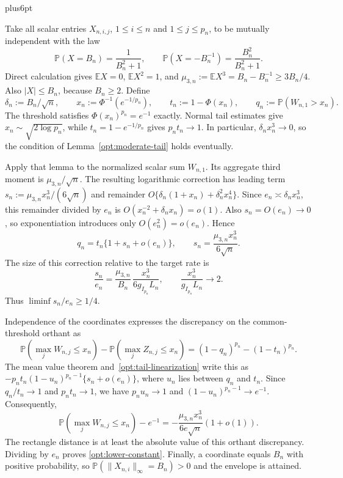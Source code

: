 \documentclass[11pt,letterpaper,twoside,leqno]{article}
\makeatletter
\theoremstyle{bookplain}
\theoremstyle{bookremark}
\renewenvironment{proof}[1][\proofname]{\par
  \pushQED{\qed}\normalfont\topsep6pt plus6pt\relax
  \trivlist\item[\hskip\labelsep\bfseries #1\@addpunct{.}]\ignorespaces
}{\popQED\endtrivlist\@endpefalse}
\newcommand{\E}{\mathbb E}
\newcommand{\Pp}{\mathbb P}
\makeatother
\begin{document}
\begin{proof}[Proof of Theorem~\ref{opt:skew-lower}]
Take all scalar entries $X_{n,i,j}$, $1\le i\le n$ and
$1\le j\le p_n$, to be mutually independent with the law
\begin{equation}
 \Pp(X=B_n)=\frac1{B_n^2+1},\qquad
 \Pp(X=-B_n^{-1})=\frac{B_n^2}{B_n^2+1}.
 \label{opt:two-point-law}
\end{equation}
Direct calculation gives $\E X=0$, $\E X^2=1$, and
$\mu_{3,n}:=\E X^3=B_n-B_n^{-1}\ge3B_n/4$.
Also $|X|\le B_n$, because $B_n\ge2$. Define
\[
 \delta_n:=B_n/\sqrt n,\qquad
 x_n:=\Phi^{-1}(e^{-1/p_n}),\qquad
 t_n:=1-\Phi(x_n),\qquad q_n:=\Pp(W_{n,1}>x_n).
\]
The threshold satisfies $\Phi(x_n)^{p_n}=e^{-1}$ exactly.
Normal tail estimates give $x_n\sim\sqrt{2\log p_n}$,
while $t_n=1-e^{-1/p_n}$ gives $p_nt_n\to1$.
In particular, $\delta_nx_n^3\to0$, so the condition of
Lemma~\ref{opt:moderate-tail} holds eventually.

Apply that lemma to the normalized scalar sum $W_{n,1}$.
Its aggregate third moment is $\mu_{3,n}/\sqrt n$.
The resulting logarithmic correction has leading term
$s_n:=\mu_{3,n}x_n^3/(6\sqrt n)$ and remainder
$O\{\delta_n(1+x_n)+\delta_n^2x_n^4\}$.
Since $e_n\asymp\delta_nx_n^3$, this remainder divided by
$e_n$ is $O(x_n^{-2}+\delta_nx_n)=o(1)$.
Also $s_n=O(e_n)\to0$, so exponentiation introduces only
$O(e_n^2)=o(e_n)$. Hence
\begin{equation}
 q_n=t_n\{1+s_n+o(e_n)\},\qquad
 s_n=\frac{\mu_{3,n}x_n^3}{6\sqrt n}.
 \label{opt:tail-linearization}
\end{equation}
The size of this correction relative to the target rate is
\[
 \frac{s_n}{e_n}
 =\frac{\mu_{3,n}}{B_n}\,
   \frac{x_n^3}{6g_{I_{p_n}}L_n},\qquad
 \frac{x_n^3}{g_{I_{p_n}}L_n}\longrightarrow2.
\]
Thus $\liminf s_n/e_n\ge1/4$.

Independence of the coordinates expresses the discrepancy on the
common-threshold orthant as
\[
 \Pp(\max_jW_{n,j}\le x_n)-\Pp(\max_jZ_{n,j}\le x_n)
 =(1-q_n)^{p_n}-(1-t_n)^{p_n}.
\]
The mean value theorem and~\eqref{opt:tail-linearization} write
this as
$-p_nt_n(1-u_n)^{p_n-1}\{s_n+o(e_n)\}$, where $u_n$
lies between $q_n$ and $t_n$. Since $q_n/t_n\to1$ and
$p_nt_n\to1$, we have $p_nu_n\to1$ and
$(1-u_n)^{p_n-1}\to e^{-1}$. Consequently,
\begin{equation}
 \Pp(\max_jW_{n,j}\le x_n)-e^{-1}
 =-\frac{\mu_{3,n}x_n^3}{6e\sqrt n}(1+o(1)).
 \label{opt:exact-product-asymptotic}
\end{equation}
The rectangle distance is at least the absolute value of this
orthant discrepancy. Dividing by $e_n$ proves
\eqref{opt:lower-constant}. Finally, a coordinate equals $B_n$
with positive probability, so
$\Pp(\|X_{n,i}\|_\infty=B_n)>0$ and the envelope is attained.
\end{proof}
\end{document}
